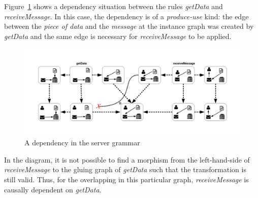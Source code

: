 \begin{example}
  Figure~\ref{fig:gts:dependency} shows a dependency situation between the rules \emph{getData} and \emph{receiveMessage}. In this case, the dependency is of a \emph{produce-use} kind: the edge between the \emph{piece of data} and the \emph{message} at the instance graph was created by \emph{getData} and the same edge is necessary for \emph{receiveMessage} to be applied.

\begin{figure}[!ht]
  \centering
  \includegraphics[scale=0.5]{images/gts/dependency}
  \caption{A dependency in the server grammar}\label{fig:gts:dependency}
\end{figure}

  In the diagram, it is not possible to find a morphism from the left-hand-side of \emph{receiveMessage} to the gluing graph of \emph{getData} such that the transformation is still valid. Thus, for the overlapping in this particular graph, \emph{receiveMessage} is causally dependent on \emph{getData}.
\end{example}

